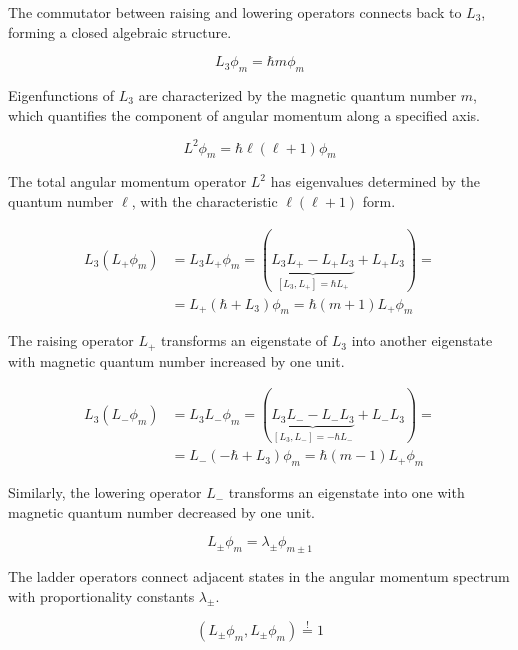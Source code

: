 The commutator between raising and lowering operators connects back to $L_3$, forming a closed algebraic structure.

\begin{equation}
L_{3} \phi_{m}=\hbar m \phi_{m}
\end{equation}

Eigenfunctions of $L_3$ are characterized by the magnetic quantum number $m$, which quantifies the component of angular momentum along a specified axis.

\begin{equation}
L^{2} \phi_{m}=\hbar \ell(\ell+1) \phi_{m}
\end{equation}

The total angular momentum operator $L^2$ has eigenvalues determined by the quantum number $\ell$, with the characteristic $\ell(\ell+1)$ form.

\begin{align}
L_{3}\left(L_{+} \phi_{m}\right) & =L_{3} L_{+} \phi_{m}=(\underbrace{L_{3} L_{+}-L_{+} L_{3}}_{\left[L_{3}, L_{+}\right]=\hbar L_{+}}+L_{+} L_{3})=  \\
& =L_{+}\left(\hbar+L_{3}\right) \phi_{m}=\hbar(m+1) L_{+} \phi_{m}
\end{align}

The raising operator $L_+$ transforms an eigenstate of $L_3$ into another eigenstate with magnetic quantum number increased by one unit.

\begin{align}
L_{3}\left(L_{-} \phi_{m}\right) & =L_{3} L_{-} \phi_{m}=(\underbrace{L_{3} L_{-}-L_{-} L_{3}}_{\left[L_{3}, L_{-}\right]=-\hbar L_{-}}+L_{-} L_{3})=  \\
& =L_{-}\left(-\hbar+L_{3}\right) \phi_{m}=\hbar(m-1) L_{+} \phi_{m}
\end{align}

Similarly, the lowering operator $L_-$ transforms an eigenstate into one with magnetic quantum number decreased by one unit.

\begin{equation}
L_{ \pm} \phi_{m}=\lambda_{ \pm} \phi_{m \pm 1}
\end{equation}

The ladder operators connect adjacent states in the angular momentum spectrum with proportionality constants $\lambda_\pm$.

\begin{equation}
\left(L_{ \pm} \phi_{m}, L_{ \pm} \phi_{m}\right) \stackrel{!}{=} 1
\end{equation}

